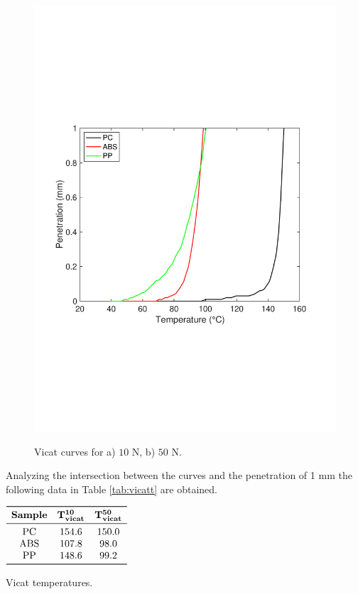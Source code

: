 \documentclass[a4paper, 11pt]{article}
\begin{document}
\begin{figure}[htp]
	{\includegraphics[scale=0.36]{vicat50}}\qquad
	\captionsetup{justification=centering}
	\caption{Vicat curves for a) $10$ N, b) $50$ N.}
	\label{fig:vicat}
\end{figure}

Analyzing the intersection between the curves and the penetration of 1 mm the following data in Table \ref{tab:vicatt} are obtained.

\begin{table}[htp]
	\centering
	$
	\begin{array}{ccc}
	\toprule
	\textbf{Sample} & \mathbf{T_{vicat}^\textbf{10}} & \mathbf{T_{vicat}^\textbf{50}} \\
	\midrule
	\text{PC} & 154.6 & 150.0\\
	\text{ABS} & 107.8 & 98.0\\
	\text{PP} & 148.6 & 99.2\\
	\bottomrule
	\end{array}
	$
	\caption{Vicat temperatures.}
	\label{tab:vicatt}
\end{table}
\end{document}
